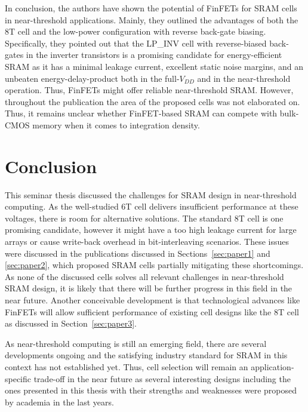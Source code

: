 \documentclass[conference]{IEEEtran}
\begin{document}
In conclusion, the authors have shown the potential of FinFETs for SRAM cells in near-threshold applications. Mainly, they outlined the advantages of both the 8T cell and the low-power configuration with reverse back-gate biasing. Specifically, they pointed out that the LP\_INV cell with reverse-biased back-gates in the inverter transistors is a promising candidate for energy-efficient SRAM as it has a minimal leakage current, excellent static noise margins, and an unbeaten energy-delay-product both in the full-$V_{DD}$ and in the near-threshold operation. Thus, FinFETs might offer reliable near-threshold SRAM. However, throughout the publication the area of the proposed cells was not elaborated on. Thus, it remains unclear whether FinFET-based SRAM can compete with bulk-CMOS memory when it comes to integration density.

\section{Conclusion} \label{sec:conclusion}

This seminar thesis discussed the challenges for SRAM design in near-threshold computing. As the well-studied 6T cell delivers insufficient performance at these voltages, there is room for alternative solutions. The standard 8T cell is one promising candidate, however it might have a too high leakage current for large arrays or cause write-back overhead in bit-interleaving scenarios. These issues were discussed in the publications discussed in Sections~\ref{sec:paper1} and \ref{sec:paper2}, which proposed SRAM cells partially mitigating these shortcomings. As none of the discussed cells solves all relevant challenges in near-threshold SRAM design, it is likely that there will be further progress in this field in the near future. Another conceivable development is that technological advances like FinFETs will allow sufficient performance of existing cell designs like the 8T cell as discussed in Section~\ref{sec:paper3}.

As near-threshold computing is still an emerging field, there are several developments ongoing and the satisfying industry standard for SRAM in this context has not established yet. Thus, cell selection will remain an application-specific trade-off in the near future as several interesting designs including the ones presented in this thesis with their strengths and weaknesses were proposed by academia in the last years.

\listoffigures

\printbibliography
\end{document}
